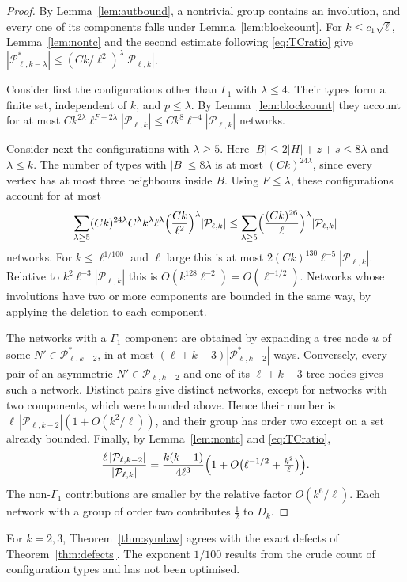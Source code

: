 \documentclass[11pt,a4paper]{article}
\theoremstyle{definition}
\newcommand{\cP}{\mathcal{P}}
\begin{document}
\begin{proof}
By Lemma~\ref{lem:autbound}, a nontrivial group contains an involution, and every one of its components falls under Lemma~\ref{lem:blockcount}. For $k\le c_1\sqrt\ell$, Lemma~\ref{lem:nontc} and the second estimate following \eqref{eq:TCratio} give $|\cP^*_{\ell,k-\lambda}|\le(Ck/\ell^2)^{\lambda}|\cP_{\ell,k}|$.

Consider first the configurations other than $\Gamma_1$ with $\lambda\le4$. Their types form a finite set, independent of $k$, and $p\le\lambda$. By Lemma~\ref{lem:blockcount} they account for at most $Ck^{2\lambda}\ell^{F-2\lambda}|\cP_{\ell,k}|\le Ck^8\ell^{-4}|\cP_{\ell,k}|$ networks.

Consider next the configurations with $\lambda\ge5$. Here $|B|\le2|H|+z+s\le8\lambda$ and $\lambda\le k$. The number of types with $|B|\le8\lambda$ is at most $(Ck)^{24\lambda}$, since every vertex has at most three neighbours inside $B$. Using $F\le\lambda$, these configurations account for at most
\[
\sum_{\lambda\ge5}(Ck)^{24\lambda}C^{\lambda}k^{\lambda}\ell^{\lambda}\Bigl(\frac{Ck}{\ell^2}\Bigr)^{\lambda}|\cP_{\ell,k}|\le\sum_{\lambda\ge5}\Bigl(\frac{(Ck)^{26}}{\ell}\Bigr)^{\lambda}|\cP_{\ell,k}|
\]
networks. For $k\le\ell^{1/100}$ and $\ell$ large this is at most $2(Ck)^{130}\ell^{-5}|\cP_{\ell,k}|$. Relative to $k^2\ell^{-3}|\cP_{\ell,k}|$ this is $O(k^{128}\ell^{-2})=O(\ell^{-1/2})$. Networks whose involutions have two or more components are bounded in the same way, by applying the deletion to each component.

The networks with a $\Gamma_1$ component are obtained by expanding a tree node $u$ of some $N'\in\cP^*_{\ell,k-2}$, in at most $(\ell+k-3)|\cP^*_{\ell,k-2}|$ ways. Conversely, every pair of an asymmetric $N'\in\cP_{\ell,k-2}$ and one of its $\ell+k-3$ tree nodes gives such a network. Distinct pairs give distinct networks, except for networks with two components, which were bounded above. Hence their number is $\ell\,|\cP_{\ell,k-2}|(1+O(k^2/\ell))$, and their group has order two except on a set already bounded. Finally, by Lemma~\ref{lem:nontc} and \eqref{eq:TCratio},
\[
\frac{\ell\,|\cP_{\ell,k-2}|}{|\cP_{\ell,k}|}=\frac{k(k-1)}{4\ell^3}\Bigl(1+O\bigl(\ell^{-1/2}+\tfrac{k^2}{\ell}\bigr)\Bigr).
\]
The non-$\Gamma_1$ contributions are smaller by the relative factor $O(k^6/\ell)$. Each network with a group of order two contributes $\frac12$ to $D_k$.
\end{proof}

For $k=2,3$, Theorem~\ref{thm:symlaw} agrees with the exact defects of Theorem~\ref{thm:defects}. The exponent $1/100$ results from the crude count of configuration types and has not been optimised.
\end{document}

